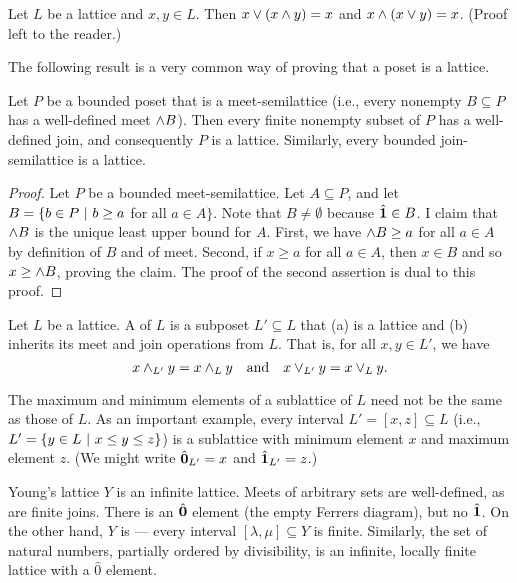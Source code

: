 \begin{proposition}
Let $L$ be a lattice and $x,y\in L$.  Then $x\vee(x\wedge y)=x$
and $x\wedge(x\vee y)=x$. (Proof left to the reader.)
\end{proposition}

The following result is a very common way of proving that a poset is a lattice.

\begin{proposition} \label{bounded-semilattice}
Let $P$ be a bounded poset that is a meet-semilattice (i.e., every nonempty $B\subseteq P$ has a well-defined meet $\wedge B$).  Then every finite nonempty subset of $P$ has a well-defined join, and consequently $P$ is a lattice.  Similarly, every bounded join-semilattice is a lattice.
\end{proposition}
\begin{proof}
Let $P$ be a bounded meet-semilattice.
Let $A\subseteq P$, and let $B=\{b\in P~|~ b\geq a$ for all $a\in A\}$.
Note that $B\neq\emptyset$ because $\hat{\mathbf{1}}\in B$.
I claim that $\wedge B$ is the unique least upper bound for $A$.
First, we have $\wedge B\geq a$ for all $a\in A$ by definition of $B$ and of meet.
Second, if $x\geq a$ for all $a\in A$, then $x\in B$ and so $x\geq\wedge B$,
proving the claim.  The proof of the second assertion is dual to this proof.
\end{proof}

\begin{definition}
Let $L$ be a lattice.  A  of $L$ is a subposet $L'\subseteq L$
that (a) is a lattice and (b) inherits its meet and join operations from $L$.
That is, for all $x,y\in L'$, we have
\[x\wedge_{L'} y = x\wedge_L y \quad\text{and}\quad x\vee_{L'} y = x\vee_L y.\]
\end{definition}

The maximum and minimum elements of a sublattice of $L$ need not be the same as those of $L$.
As an important example, every interval $L'=[x,z]\subseteq L$ (i.e., $L'=\{y\in L~|~ x\leq y\leq z\}$)
is a sublattice with minimum element $x$ and maximum element $z$.  (We might write $\hat{\mathbf{0}}_{L'}=x$
and $\hat{\mathbf{1}}_{L'}=z$.)

\begin{example}
Young's lattice $Y$ is an infinite lattice.  Meets of arbitrary sets are well-defined, as are finite joins.  There is an $\hat{\mathbf{0}}$ element (the empty Ferrers diagram), but no $\hat{\mathbf{1}}$.  On the other hand, $Y$ is  --- every interval $[\lambda,\mu]\subseteq Y$ is finite.  Similarly, the set of natural numbers, partially ordered by divisibility, is an infinite, locally finite lattice with a $\hat0$ element.
\end{example}

